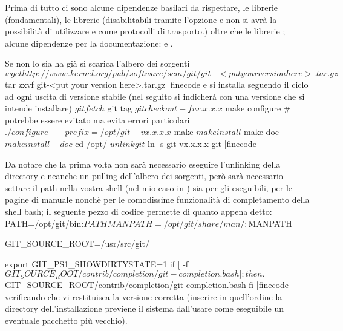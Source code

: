 Prima di tutto ci sono alcune dipendenze basilari da rispettare, le librerie
 (fondamentali), le librerie  (disabilitabili tramite
l'opzione  e non si avr\`a la
possibilit\`a di utilizzare  e  come protocolli di
trasporto.) oltre che le librerie ; alcune dipendenze per la
documentazione:  e .

Se non lo sia ha gi\`a si scarica l'albero dei sorgenti
\iniziacode
$ wget http://www.kernel.org/pub/software/scm/git/git-<put your version here>.tar.gz
$ tar zxvf git-<put your version here>.tar.gz
|finecode
e si installa seguendo il ciclo ad ogni uscita di versione stabile (nel seguito
si indicher\`a con  una versione che si intende installare)
\iniziacode
$ git fetch
$ git tag
$ git checkout -f vx.x.x.x
$ make configure # potrebbe essere evitato ma evita errori particolari
$ ./configure --prefix=/opt/git-vx.x.x.x
$ make
$ make install
$ make doc
$ make install-doc
$ cd /opt/
$ unlink git
$ ln -s git-vx.x.x.x git
|finecode

Da notare che la prima volta non sar\`a necessario eseguire l'unlinking della
directory  e neanche un pulling dell'albero dei sorgenti, per\`o
sar\`a necessario settare il path nella vostra shell (nel mio caso in
) sia per gli eseguibili, per le pagine di manuale nonch\`e per le
comodissime funzionalit\`a di completamento della shell bash; il seguente pezzo
di codice permette di quanto appena detto:
\iniziacode
PATH=/opt/git/bin:$PATH
MANPATH=/opt/git/share/man/:$MANPATH

GIT_SOURCE_ROOT=/usr/src/git/

export GIT_PS1_SHOWDIRTYSTATE=1
if [ -f $GIT_SOURCE_ROOT/contrib/completion/git-completion.bash ];
then
  . $GIT_SOURCE_ROOT/contrib/completion/git-completion.bash
fi
|finecode
verificando che  vi restituisca la versione corretta
(inserire in quell'ordine la directory dell'installazione previene il sistema
dall'usare come eseguibile un eventuale pacchetto pi\`u vecchio).

